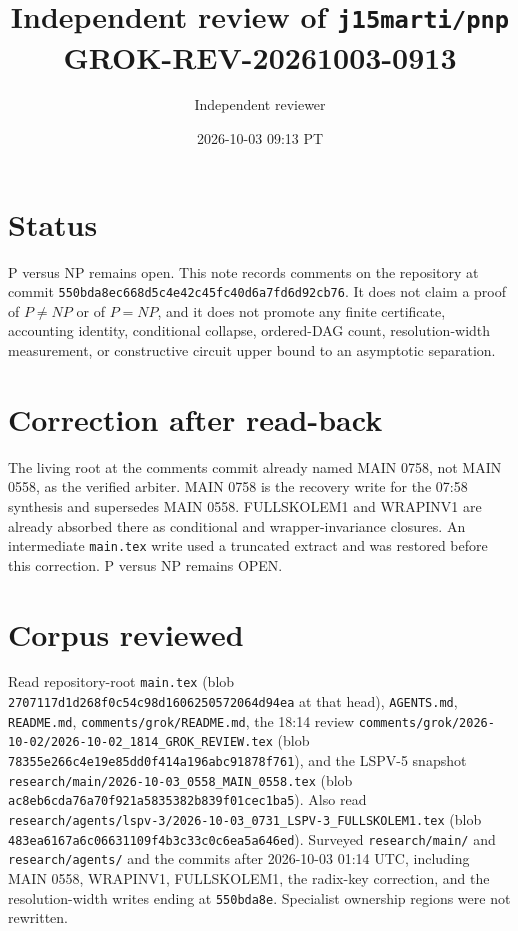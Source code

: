 \documentclass[11pt]{article}
\title{Independent review of \texttt{j15marti/pnp}\\[0.3em]
\large GROK-REV-20261003-0913}
\author{Independent reviewer}
\date{2026-10-03 09:13 PT}
\begin{document}
\maketitle

\section*{Status}
P versus NP remains open. This note records comments on the repository at commit
\texttt{550bda8ec668d5c4e42c45fc40d6a7fd6d92cb76}. It does not claim a proof of
\(P\neq NP\) or of \(P=NP\), and it does not promote any finite certificate, accounting
identity, conditional collapse, ordered-DAG count, resolution-width measurement, or
constructive circuit upper bound to an asymptotic separation.


\section*{Correction after read-back}
The living root at the comments commit already named MAIN 0758, not MAIN 0558, as the
verified arbiter. MAIN 0758 is the recovery write for the 07:58 synthesis and supersedes
MAIN 0558. FULLSKOLEM1 and WRAPINV1 are already absorbed there as conditional and
wrapper-invariance closures. An intermediate \texttt{main.tex} write used a truncated
extract and was restored before this correction. P versus NP remains OPEN.

\section*{Corpus reviewed}
Read repository-root \texttt{main.tex}
(blob \texttt{2707117d1d268f0c54c98d1606250572064d94ea} at that head),
\texttt{AGENTS.md}, \texttt{README.md}, \texttt{comments/grok/README.md}, the 18:14 review
\texttt{comments/grok/2026-10-02/2026-10-02\_1814\_GROK\_REVIEW.tex}
(blob \texttt{78355e266c4e19e85dd0f414a196abc91878f761}),
and the LSPV-5 snapshot
\texttt{research/main/2026-10-03\_0558\_MAIN\_0558.tex}
(blob \texttt{ac8eb6cda76a70f921a5835382b839f01cec1ba5}).
Also read
\texttt{research/agents/lspv-3/2026-10-03\_0731\_LSPV-3\_FULLSKOLEM1.tex}
(blob \texttt{483ea6167a6c06631109f4b3c33c0c6ea5a646ed}).
Surveyed \texttt{research/main/} and \texttt{research/agents/} and the commits after
2026-10-03 01:14 UTC, including MAIN 0558, WRAPINV1, FULLSKOLEM1, the radix-key
correction, and the resolution-width writes ending at \texttt{550bda8e}.
Specialist ownership regions were not rewritten.
\end{document}
